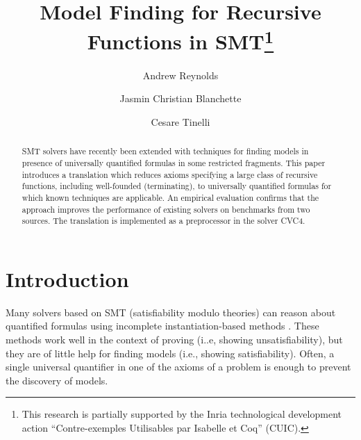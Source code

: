 \documentclass[runningheads,a4paper]{llncs}
\newcommand\cvc{CVC4\xspace}
\newcommand{\rem}[1]{\textcolor{red}{[#1]}}
\newcommand{\ct}[1]{\rem{#1 --ct}}
\begin{document}
\title{Model Finding for Recursive Functions in SMT\thanks{%
This research is partially supported by the Inria technological development
action ``Contre-exemples Utilisables par Isabelle et Coq'' (CUIC).
}
}

\author {Andrew Reynolds \and Jasmin Christian Blanchette \and Cesare Tinelli }

\maketitle

\begin{abstract}
SMT solvers have recently been extended with techniques for finding models
in presence of universally quantified formulas in some restricted fragments.
This paper introduces a translation which reduces axioms specifying a large
class of recursive functions, including well-founded (terminating),
to universally quantified formulas for which known
techniques are applicable.
An empirical evaluation confirms that the approach improves 
the performance of existing solvers on benchmarks from two sources. 
The translation is implemented as a preprocessor in the solver CVC4.
\end{abstract}

\setcounter{footnote}{0}

\section{Introduction}
\label{sec:introduction}


Many solvers based on SMT (satisfiability modulo theories) can reason about
quantified formulas using incomplete instantiation-based methods
\cite{MouraBjoerner07,ReynoldsTinelliMoura14}.
These methods work well in the context of proving (i..e, showing
unsatisfiability), but they are of little help for finding models (i.e.,
showing satisfiability). Often, a single universal quantifier in one of the
axioms of a problem is enough to prevent the discovery of models.
\end{document}
